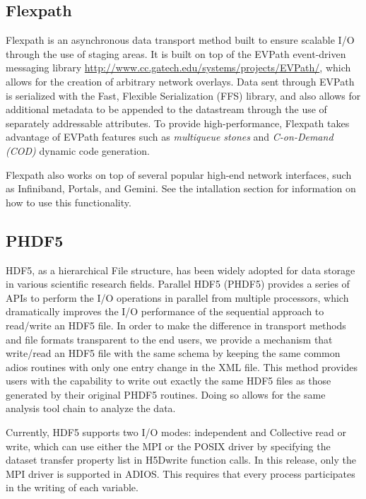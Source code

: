 \subsection{Flexpath}
\label{section-method-flexpath}
Flexpath is an asynchronous data transport method built to ensure scalable I/O through the use of staging areas. It is built on top of the EVPath event-driven messaging library \url{http://www.cc.gatech.edu/systems/projects/EVPath/}, which allows for the creation of arbitrary network overlays. Data sent through EVPath is serialized with the Fast, Flexible Serialization (FFS) library, and also allows for additional metadata to be appended to the datastream through the use of separately addressable attributes. To provide high-performance, Flexpath takes advantage of EVPath features such as {\em multiqueue stones} and {\em C-on-Demand (COD)} dynamic code generation.

Flexpath also works on top of several popular high-end network interfaces, such as Infiniband, Portals, and Gemini. See the intallation section for information on how to use this functionality. 


\subsection{PHDF5}

HDF5, as a hierarchical File structure, has been widely adopted for data storage 
in various scientific research fields.  Parallel HDF5 (PHDF5) provides a series 
of APIs to perform the I/O operations in parallel from multiple processors, which 
dramatically improves the I/O performance of the sequential approach to read/write 
an HDF5 file. In order to make the difference in transport methods and file formats 
transparent to the end users, we provide a mechanism that write/read an HDF5 file 
with the same schema by keeping the same common adios routines with only one entry 
change in the XML file. This method provides users with the capability to write 
out exactly the same HDF5 files as those generated by their original PHDF5 routines. 
Doing so allows for the same analysis tool chain to analyze the data. 

Currently, HDF5 supports two I/O modes: independent and Collective read or write, 
which can use either the MPI or the POSIX driver by specifying the dataset transfer 
property list in H5Dwrite function calls. In this release, only the MPI driver 
is supported in ADIOS.
This requires that every process participates in the writing of each variable. 

